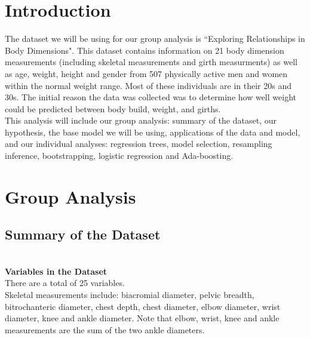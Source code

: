 \documentclass[11pt]{article}\usepackage[]{graphicx}\usepackage[]{color}
\begin{document}

\section{Introduction} %

The dataset we will be using for our group analysis is ``Exploring Relationships in Body Dimensions". This dataset contains information on 21 body dimension measurements (including skeletal measurements and girth measurments) as well as age, weight, height and gender from 507 physically active men and women within the normal weight range. Most of these individuals are in their 20s and 30s. The initial reason the data was collected was to determine how well weight could be predicted between body build, weight, and girths. \\ 

This analysis will include our group analysis: summary of the dataset, our hypothesis, the base model we will be using, applications of the data and model, and our individual analyses: regression trees, model selection, resampling inference, bootstrapping, logistic regression and Ada-boosting.

\section{Group Analysis} 






\subsection{Summary of the Dataset}

\\

\textbf{Variables in the Dataset}\\ %

There are a total of 25 variables.\\

Skeletal measurements include: biacromial diameter, pelvic breadth, bitrochanteric diameter, chest depth, chest diameter, elbow diameter, wrist diameter, knee and ankle diameter. Note that elbow, wrist, knee and ankle measurements are the sum of the two ankle diameters.\\
\end{document}
